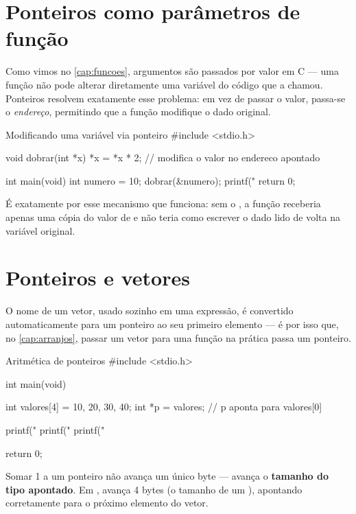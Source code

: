 \section{Ponteiros como parâmetros de função}

Como vimos no \cref{cap:funcoes}, argumentos são passados por valor em C — uma função não pode alterar diretamente uma variável do código que a chamou. Ponteiros resolvem exatamente esse problema: em vez de passar o valor, passa-se o \emph{endereço}, permitindo que a função modifique o dado original.

\begin{codigoc}{Modificando uma variável via ponteiro}
#include <stdio.h>

void dobrar(int *x) {
    *x = *x * 2;   // modifica o valor no endereco apontado
}

int main(void) {
    int numero = 10;
    dobrar(&numero);
    printf("%
    return 0;
}
\end{codigoc}

\begin{dica}
É exatamente por esse mecanismo que  funciona: sem o \code{\&}, a função receberia apenas uma cópia do valor de  e não teria como escrever o dado lido de volta na variável original.
\end{dica}

\section{Ponteiros e vetores}

O nome de um vetor, usado sozinho em uma expressão, é convertido automaticamente para um ponteiro ao seu primeiro elemento — é por isso que, no \cref{cap:arranjos}, passar um vetor para uma função na prática passa um ponteiro.

\begin{codigoc}{Aritmética de ponteiros}
#include <stdio.h>

int main(void) {
    int valores[4] = {10, 20, 30, 40};
    int *p = valores;   // p aponta para valores[0]

    printf("%
    printf("%
    printf("%

    return 0;
}
\end{codigoc}

Somar 1 a um ponteiro não avança um único byte — avança o \textbf{tamanho do tipo apontado}. Em ,  avança 4 bytes (o tamanho de um ), apontando corretamente para o próximo elemento do vetor.

